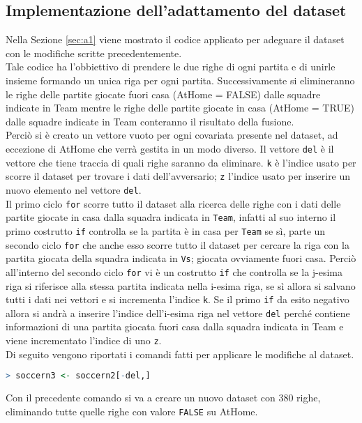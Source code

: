 \subsection{Implementazione dell'adattamento del dataset}
Nella Sezione \ref{sec:a1} viene mostrato il codice applicato per adeguare il dataset con le modifiche scritte precedentemente.\\
Tale codice ha l'obbiettivo di prendere le due righe di ogni partita e di unirle insieme formando un unica riga per ogni partita. Successivamente si elimineranno le righe delle partite giocate fuori casa (\textsf{AtHome} = FALSE) dalle squadre indicate in \textsf{Team} mentre le righe delle partite giocate in casa (\textsf{AtHome} = TRUE) dalle squadre indicate in \textsf{Team} conteranno il risultato della fusione.\\
Perciò si è creato un vettore vuoto per ogni covariata presente nel dataset, ad eccezione di \textsf{AtHome} che verrà gestita in un modo diverso. Il vettore \texttt{del} è il vettore che tiene traccia di quali righe saranno da eliminare. \texttt{k} è l'indice usato per scorre il dataset per trovare i dati dell'avversario; \texttt{z} l'indice usato per inserire un nuovo elemento nel vettore \texttt{del}.\\
Il primo ciclo \texttt{for} scorre tutto il dataset alla ricerca delle righe con i dati delle partite giocate in casa dalla squadra indicata in \texttt{Team}, infatti al suo interno il primo costrutto \texttt{if} controlla se la partita è in casa per \texttt{Team} se sì, parte un secondo ciclo \texttt{for} che anche esso scorre tutto il dataset per cercare la riga con la partita giocata della squadra indicata in \texttt{Vs}; giocata ovviamente fuori casa. Perciò all'interno del secondo ciclo \texttt{for} vi è un costrutto \texttt{if} che controlla se la j-esima riga si riferisce alla stessa partita indicata nella i-esima riga, se sì allora si salvano tutti i dati nei vettori e si incrementa l'indice \texttt{k}. Se il primo \texttt{if} da esito negativo allora si andrà a inserire l'indice dell'i-esima riga nel vettore \texttt{del} perché contiene informazioni di una partita giocata fuori casa dalla squadra indicata in \textsf{Team} e viene incrementato l'indice di uno \texttt{z}.\\

Di seguito vengono riportati i comandi fatti per applicare le modifiche al dataset.
\bigskip
\begin{lstlisting}[language=R]
> soccern3 <- soccern2[-del,]
\end{lstlisting}
\bigskip
Con il precedente comando si va a creare un nuovo dataset con 380 righe, eliminando tutte quelle righe con valore \texttt{FALSE} su \textsf{AtHome}. \\

